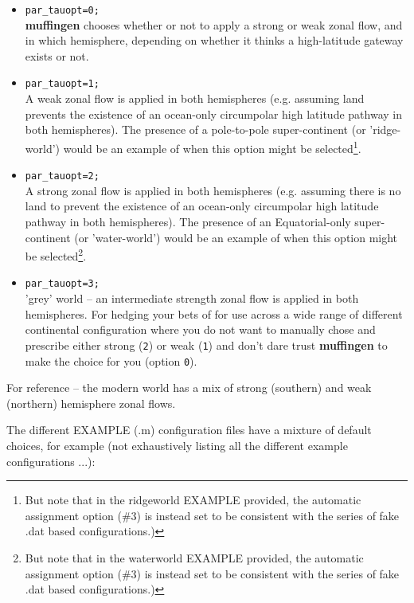 \documentclass[11pt,fleqn]{book} %
\begin{document}
\vspace{1mm}
\begin{itemize}
\item \texttt{par\_tauopt=0;}
\\\textbf{muffingen} chooses whether or not to apply a strong or weak zonal flow, and in which hemisphere, depending on whether it thinks a high-latitude gateway exists or not.
\item \texttt{par\_tauopt=1;}
\\A weak zonal flow is applied in both hemispheres (e.g. assuming land prevents the existence of an ocean-only circumpolar high latitude pathway  in both hemispheres).
The presence of a pole-to-pole super-continent (or 'ridge-world') would be an example of when this option might be selected\footnote{But note that in the ridgeworld EXAMPLE provided, the automatic assignment option (\#3) is instead set to be consistent with the series of fake .dat based configurations.)}.
\item \texttt{par\_tauopt=2;}
\\A strong zonal flow is applied in both hemispheres (e.g. assuming there is no land to prevent the existence of an ocean-only circumpolar high latitude pathway  in both hemispheres). The presence of an Equatorial-only super-continent (or 'water-world') would be an example of when this option might be selected\footnote{But note that in the waterworld EXAMPLE provided, the automatic assignment option (\#3) is instead set to be consistent with the series of fake .dat based configurations.)}.
\item \texttt{par\_tauopt=3;}
\\'grey' world -- an intermediate strength zonal flow is applied in both hemispheres. For hedging your bets of for use across a wide range of different continental configuration where you do not want to manually chose and prescribe either strong (\texttt{2}) or weak (\texttt{1}) and don't dare trust \textbf{muffingen} to make the choice for you (option \texttt{0}).
\end{itemize} 
\vspace{1mm}

For reference -- the modern world has a mix of strong (southern) and weak (northern) hemisphere zonal flows.

The different \textsf{\footnotesize EXAMPLE} (\textsf{\footnotesize .m}) configuration files have a mixture of default choices, for example (not exhaustively listing all the different example configurations ...):
\end{document}
